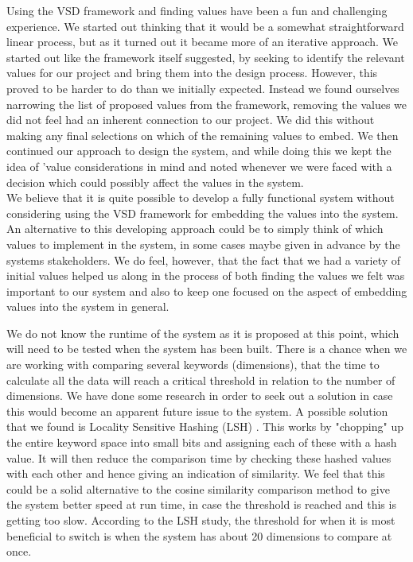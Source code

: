 Using the VSD framework and finding values have been a fun and challenging experience. We started out thinking that it would be a somewhat straightforward linear process, but as it turned out it became more of an iterative approach. We started out like the framework itself suggested, by seeking to identify the relevant values for our project and bring them into the design process. However, this proved to be harder to do than we initially expected. Instead we found ourselves narrowing the list of proposed values from the framework, removing the values we did not feel had an inherent connection to our project. We did this without making any final selections on which of the remaining values to embed. We then continued our approach to design the system, and while doing this we kept the idea of 'value considerations in mind and noted whenever we were faced with a decision which could possibly affect the values in the system. \\
We believe that it is quite possible to develop a fully functional system without considering using the VSD framework for embedding the values into the system. An alternative to this developing approach could be to simply think of which values to implement in the system, in some cases maybe given in advance by the systems stakeholders. We do feel, however, that the fact that we had a variety of initial values helped us along in the process of both finding the values we felt was important to our system and also to keep one focused on the aspect of embedding values into the system in general.

We do not know the runtime of the system as it is proposed at this point, which will need to be tested when the system has been built. There is a chance when we are working with comparing several keywords (dimensions), that the time to calculate all the data will reach a critical threshold in relation to the number of dimensions.  We have done some research in order to seek out a solution in case this would become an apparent future issue to the system. A possible solution that we found is Locality Sensitive Hashing (LSH) . This works by "chopping" up the entire keyword space into small bits and assigning each of these with a hash value. It will then reduce the   comparison time by checking these hashed values with each other and hence giving an indication of similarity. We feel that this could be a solid alternative to the cosine similarity comparison method to give the system better speed at run time, in case the threshold is reached and this is getting too slow. According to the LSH study, the threshold for when it is most beneficial to switch is when the system has about 20 dimensions to compare at once.


